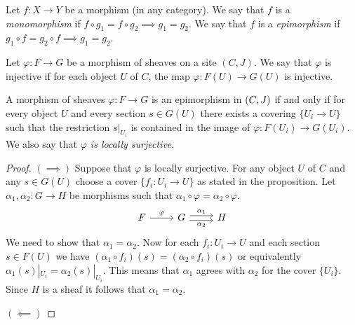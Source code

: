 \begin{definition}
	Let $f: X \to Y$ be a morphism (in any category). We say that $f$ is a \textit{monomorphism} if $f \circ g_1 = f \circ g_2 \implies g_1 = g_2$.
	We say that $f$ is a \textit{epimorphism} if $g_1 \circ  f  = g_2 \circ f \implies g_1 = g_2$.
\end{definition}

\begin{proposition}[Monomorphisms in $\sh(C,J)$]
	Let $\varphi: F \to G$ be a morphism of sheaves on a site $(C,J)$. We say that $\varphi$ is injective if for each object $U$ of $C$, the map $\varphi: F(U) \to G(U)$ is injective.
\end{proposition}

\begin{proposition}[Epimorphisms in $\sh(C,J)$]
	A morphism of sheaves $\varphi: F \to G$ is an epimorphism in $\mathcal{(}C,J)$ if and only if for every object $U$ and every section $s \in G(U)$ there exists a covering $\{U_i \to U\}$ such that the restriction $s|_{U_i}$ is contained in the image of $\varphi: F(U_i) \to G(U_i)$. We also say that \textit{$\varphi$ is locally surjective}.
\end{proposition}

\begin{proof}
	$(\implies)$ Suppose that $\varphi$ is locally surjective. For any object $U$ of $C$ and any $s \in G(U)$ choose a cover $\{f_i: U_i \to U\}$ as stated in the proposition. Let $\alpha_1, \alpha_2: G \to H$ be morphisms such that $\alpha_1 \circ \varphi = \alpha_2 \circ \varphi$. 
	\[
		\begin{tikzcd}
			F & G & H
			\arrow["\varphi", from=1-1, to=1-2]
			\arrow["{\alpha_2}"', shift right=1, from=1-2, to=1-3]
			\arrow["{\alpha_1}", shift left=1, from=1-2, to=1-3]
		\end{tikzcd}\]
	We need to show that $\alpha_1 = \alpha_2$.  Now for each $f_i: U_i \to U$ and each section $s \in F(U)$ we have $(\alpha_1 \circ f_i)(s) = (\alpha_2 \circ f_i)(s)$ or equivalently  $\alpha_1(s)|_{U_i} = \alpha_2(s)|_{U_i}$. This means that $\alpha_1$ agrees with $\alpha_2$ for the cover $\{U_i\}$. Since $H$ is a sheaf it follows that $\alpha_1 = \alpha_2$.\par
	$(\impliedby)$ 
\end{proof}

